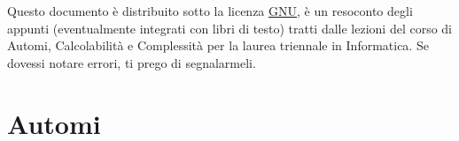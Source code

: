 \documentclass[10pt, letterpaper]{report}
\begin{document}
\newpage
\pagecolor{cartaRiciclata}%
\Large
Questo documento è distribuito sotto la licenza 
\color{blue}\href{https://www.gnu.org/licenses/fdl-1.3.txt}{GNU}\color{black},  
è un resoconto degli appunti (eventualmente integrati con libri di testo) tratti dalle lezioni del corso di Automi, Calcolabilità e Complessità
\hphantom{a}per la laurea 
triennale in Informatica. Se dovessi notare errori, ti prego di segnalarmeli.
\newpage %
\normalsize
\tableofcontents 
\newpage

\fancyhf{}
\fancyhead[L]{\nouppercase{\leftmark}}
\fancyfoot[C]{\thepage}


\chapter{Automi}
\end{document}
